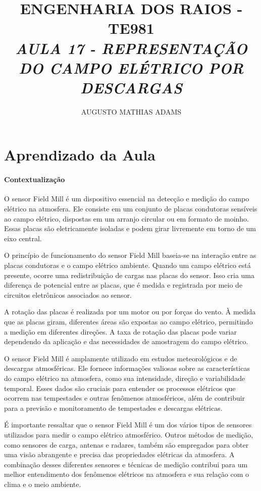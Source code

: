 \documentclass[a4paper, 12pt, onecolumn,singlespacing]{article}
\title{\normalsize{ENGENHARIA DOS RAIOS - TE981}\\ \huge{\textbf\textit{{AULA 17 - REPRESENTAÇÃO DO CAMPO ELÉTRICO POR DESCARGAS}}\\}}
\author{\small{AUGUSTO MATHIAS ADAMS}}
\begin{document}
	
	\maketitle
	
	\section{Aprendizado da Aula}
	
	\paragraph{Contextualização}
		O sensor Field Mill é um dispositivo essencial na detecção e medição do campo elétrico na atmosfera. Ele consiste em um conjunto de placas condutoras sensíveis ao campo elétrico, dispostas em um arranjo circular ou em formato de moinho. Essas placas são eletricamente isoladas e podem girar livremente em torno de um eixo central.
		
		O princípio de funcionamento do sensor Field Mill baseia-se na interação entre as placas condutoras e o campo elétrico ambiente. Quando um campo elétrico está presente, ocorre uma redistribuição de cargas nas placas do sensor. Isso cria uma diferença de potencial entre as placas, que é medida e registrada por meio de circuitos eletrônicos associados ao sensor.
		
		A rotação das placas é realizada por um motor ou por forças do vento. À medida que as placas giram, diferentes áreas são expostas ao campo elétrico, permitindo a medição em diferentes direções. A taxa de rotação das placas pode variar dependendo da aplicação e das necessidades de amostragem do campo elétrico.
		
		O sensor Field Mill é amplamente utilizado em estudos meteorológicos e de descargas atmosféricas. Ele fornece informações valiosas sobre as características do campo elétrico na atmosfera, como sua intensidade, direção e variabilidade temporal. Esses dados são cruciais para entender os processos elétricos que ocorrem nas tempestades e outras fenômenos atmosféricos, além de contribuir para a previsão e monitoramento de tempestades e descargas elétricas.
		
		É importante ressaltar que o sensor Field Mill é um dos vários tipos de sensores utilizados para medir o campo elétrico atmosférico. Outros métodos de medição, como sensores de carga, antenas e radares, também são empregados para obter uma visão abrangente e precisa das propriedades elétricas da atmosfera. A combinação desses diferentes sensores e técnicas de medição contribui para um melhor entendimento dos fenômenos elétricos na atmosfera e sua relação com o clima e o meio ambiente.
		
\end{document}
